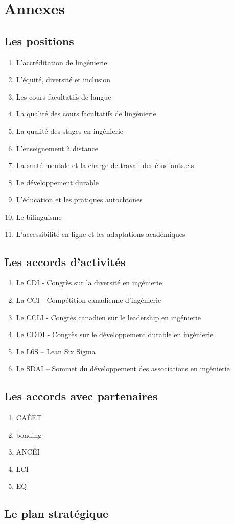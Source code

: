 \section{Annexes}
\label{annexes}

\subsection{Les positions}
\label{les-positions}

\begin{enumerate}
 \item
  L'accréditation de l\textquotesingle ingénierie
 \item
  L'équité, diversité et inclusion
 \item
  Les cours facultatifs de langue
 \item
  La qualité des cours facultatifs de l\textquotesingle ingénierie
 \item
  La qualité des stages en ingénierie
 \item
  L'enseignement à distance
 \item
  La santé mentale et la charge de travail des étudiants.e.s
 \item
  Le développement durable
 \item
  L'éducation et les pratiques autochtones
 \item
  Le bilinguisme
 \item
  L'accessibilité en ligne et les adaptations académiques
\end{enumerate}

\subsection{Les accords d'activités}
\label{les-accords-dactivituxe9s-1}

\begin{enumerate}
 \item
  Le CDI - Congrès sur la diversité en ingénierie
 \item
  La CCI - Compétition canadienne d'ingénierie
 \item
  Le CCLI - Congrès canadien sur le leadership en ingénierie
 \item
  Le CDDI - Congrès sur le développement durable en ingénierie
 \item
  Le L6S – Lean Six Sigma
 \item
  Le SDAI – Sommet du développement des associations en ingénierie
\end{enumerate}

\subsection{Les accords avec partenaires}
\label{les-accords-avec-partenaires}

\begin{enumerate}
 \item
  CAÉET
 \item
  bonding
 \item
  ANCÉI
 \item
  LCI
 \item
  EQ
\end{enumerate}

\subsection{Le plan stratégique}
\label{le-plan-stratuxe9gique}
